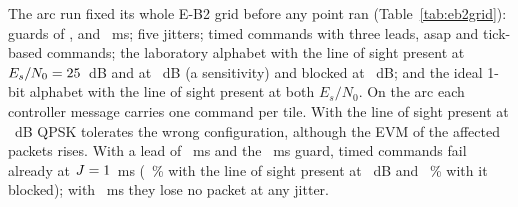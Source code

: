 The arc run fixed its whole E-B2 grid before any point ran
(Table~\ref{tab:eb2grid}): guards of \numEbGuardShortMs, \numEbGuardMs{} and
\numEbGuardLongMs~ms; five jitters; timed commands with three leads, asap and tick-based
commands; the laboratory alphabet with the line of sight present at $E_s/N_0=25$~dB
and at \numEbArcEsnoLowDb~dB (a sensitivity) and blocked at \numEbEsnoDb~dB; and the ideal
1-bit alphabet with the line of sight present at both $E_s/N_0$. On the arc each controller
message carries one command per tile. With the line of sight present at \numEbEsnoDb~dB QPSK
tolerates the wrong configuration, although the EVM of the affected packets rises. With a lead
of \numEbLeadMinMs~ms and the \numEbGuardMs~ms guard, timed commands fail already at
$J=1$~ms (\numEbArcTimedHalfPerOneLosPct~\% with the line of sight present at
\numEbArcEsnoLowDb~dB and \numEbArcTimedHalfPerOneBlkPct~\% with it blocked); with
\numEbLeadMaxMs~ms they lose no packet at any jitter.



